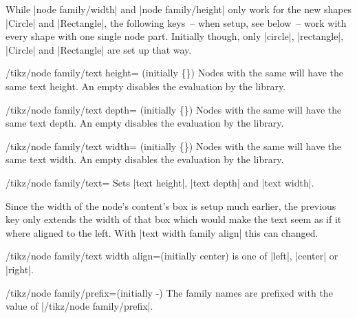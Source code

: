 While |node family/width| and |node family/height| only work for the new shapes |Circle| and |Rectangle|,
the following keys~-- when setup, see below~-- work with every shape with one single node part.
Initially though, only |circle|, |rectangle|, |Circle| and |Rectangle| are set up that way.
\begin{key}{/tikz/node family/text height= (initially \{\})}
Nodes with the same  will have the same text height.
An empty  disables the evaluation by the library.
\end{key}

\begin{key}{/tikz/node family/text depth= (initially \{\})}
Nodes with the same   will have the same text depth.
An empty  disables the evaluation by the library.
\end{key}

\begin{key}{/tikz/node family/text width= (initially \{\})}
Nodes with the same  will have the same text width.
An empty  disables the evaluation by the library.
\end{key}

\begin{key}{/tikz/node family/text=}
Sets |text height|, |text depth| and |text width|.
\end{key}

Since the width of the node's content's box is setup much earlier,
the previous key only extends the width of that box which would make the text
seem as if it where aligned to the left.
With |text width family align| this can changed.
\begin{key}{/tikz/node family/text width align=(initially center)}
 is one of |left|, |center| or |right|.

\begin{codeexample}[preamble=\usetikzlibrary{positioning,ext.node-families},/tikz/node distance=.5cm]
\tikzexternaldisable %
\end{codeexample}
\end{key}

\begin{key}{/tikz/node family/prefix=(initially \string\pgfpictureid-)}
The family names are prefixed with the value of |/tikz/node family/prefix|.
\end{key}

